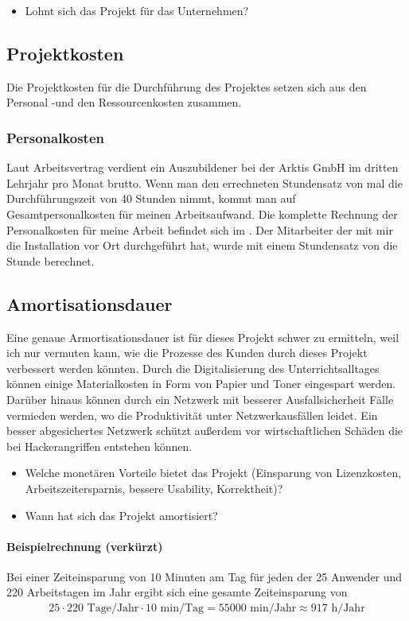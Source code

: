 \begin{itemize}
	\item Lohnt sich das Projekt für das Unternehmen?
\end{itemize}

\subsection{Projektkosten}
\label{sec:Projektkosten}
Die Projektkosten für die Durchführung des Projektes setzen sich aus den Personal -und den Ressourcenkosten zusammen.
\subsubsection{Personalkosten}
Laut Arbeitsvertrag verdient ein Auszubildener bei der Arktis GmbH im dritten Lehrjahr pro Monat  brutto. 
Wenn man den errechneten Stundensatz von  mal die Durchführungszeit von 40 Stunden nimmt, kommt man auf  Gesamtpersonalkosten für meinen Arbeitsaufwand. Die komplette Rechnung der Personalkosten für meine Arbeit befindet sich im . 
Der Mitarbeiter der mit mir die Installation vor Ort durchgeführt hat, wurde mit einem Stundensatz von  die Stunde berechnet.  

\subsection{Amortisationsdauer}
\label{sec:Amortisationsdauer}
Eine genaue Armortisationsdauer ist für dieses Projekt schwer zu ermitteln, weil ich nur vermuten kann, wie die Prozesse des Kunden durch dieses Projekt verbessert werden könnten. Durch die Digitalisierung des Unterrichtsalltages können einige Materialkosten in Form von Papier und Toner eingespart werden. Darüber hinaus können durch ein Netzwerk mit besserer Ausfallsicherheit Fälle vermieden werden, wo die Produktivität unter Netzwerkausfällen leidet. Ein besser abgesichertes Netzwerk schützt außerdem vor wirtschaftlichen Schäden die bei Hackerangriffen entstehen können. 
\begin{itemize}
	\item Welche monetären Vorteile bietet das Projekt (\zB Einsparung von Lizenzkosten, Arbeitszeitersparnis, bessere Usability, Korrektheit)?
	\item Wann hat sich das Projekt amortisiert?
\end{itemize}

\paragraph{Beispielrechnung (verkürzt)}
Bei einer Zeiteinsparung von 10 Minuten am Tag für jeden der 25 Anwender und 220 Arbeitstagen im Jahr ergibt sich eine gesamte Zeiteinsparung von 
\begin{eqnarray}
25 \cdot 220 \mbox{ Tage/Jahr} \cdot 10 \mbox{ min/Tag} = 55000 \mbox{ min/Jahr} \approx 917 \mbox{ h/Jahr} 
\end{eqnarray}


